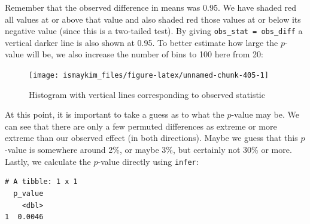 \documentclass[12pt,]{krantz}
\makeatletter
\newenvironment{Shaded}{\begin{snugshade}}{\end{snugshade}}
\newcommand{\KeywordTok}[1]{\textcolor[rgb]{0.27,0.27,0.27}{\textbf{#1}}}
\newcommand{\DataTypeTok}[1]{\textcolor[rgb]{0.27,0.27,0.27}{#1}}
\newcommand{\DecValTok}[1]{\textcolor[rgb]{0.06,0.06,0.06}{#1}}
\newcommand{\StringTok}[1]{\textcolor[rgb]{0.5,0.5,0.5}{#1}}
\newcommand{\OperatorTok}[1]{\textcolor[rgb]{0.43,0.43,0.43}{\textbf{#1}}}
\newcommand{\NormalTok}[1]{#1}
\newenvironment{kframe}{%
\medskip{}
\setlength{\fboxsep}{.8em}
 \def\at@end@of@kframe{}%
 \ifinner\ifhmode%
  \def\at@end@of@kframe{\end{minipage}}%
  \begin{minipage}{\columnwidth}%
 \fi\fi%
 \def\FrameCommand##1{\hskip\@totalleftmargin \hskip-\fboxsep
 \colorbox{shadecolor}{##1}\hskip-\fboxsep
     \hskip-\linewidth \hskip-\@totalleftmargin \hskip\columnwidth}%
 \MakeFramed {\advance\hsize-\width
   \@totalleftmargin\z@ \linewidth\hsize
   \@setminipage}}%
 {\par\unskip\endMakeFramed%
 \at@end@of@kframe}
\renewenvironment{Shaded}{\begin{kframe}}{\end{kframe}}
\makeatother
\begin{document}
Remember that the observed difference in means was 0.95. We have shaded
red all values at or above that value and also shaded red those values
at or below its negative value (since this is a two-tailed test). By
giving \texttt{obs\_stat\ =\ obs\_diff} a vertical darker line is also
shown at 0.95. To better estimate how large the \(p\)-value will be, we
also increase the number of bins to 100 here from 20:

\begin{Shaded}
\end{Shaded}

\begin{figure}

{\centering \texttt{[image: ismaykim\_files/figure-latex/unnamed-chunk-405-1]} 

}

\caption{Histogram with vertical lines corresponding to observed statistic}\label{fig:unnamed-chunk-405}
\end{figure}

At this point, it is important to take a guess as to what the
\(p\)-value may be. We can see that there are only a few permuted
differences as extreme or more extreme than our observed effect (in both
directions). Maybe we guess that this \(p\)-value is somewhere around
2\%, or maybe 3\%, but certainly not 30\% or more. Lastly, we calculate
the \(p\)-value directly using \texttt{infer}:

\begin{Shaded}
\end{Shaded}

\begin{verbatim}
# A tibble: 1 x 1
  p_value
    <dbl>
1  0.0046
\end{verbatim}
\end{document}
